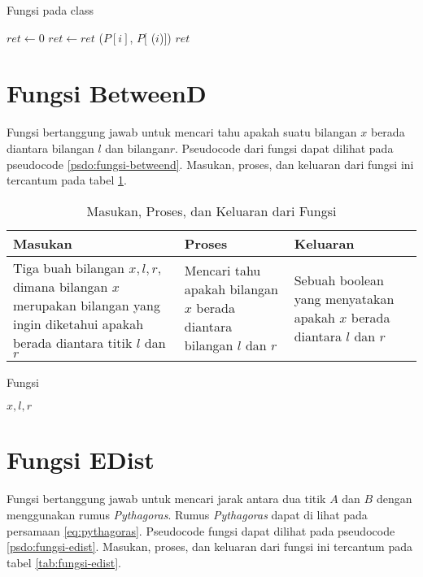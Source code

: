\begin{algorithm}
    \caption{Fungsi  pada class }
	\label{psdo:class-polygon-perimeter}
    \begin{algorithmic}[1]
        \State $ret \leftarrow 0$
            \State $ret \leftarrow ret $ ($P[i]$, $P[$ ($i$)$] $)
        \EndFor
        \State \Return $ret$
	\end{algorithmic}
\end{algorithm}

\section{ Fungsi BetweenD}
\label{sec:fungsi-betweend}
Fungsi  bertanggung jawab untuk mencari tahu apakah suatu bilangan $x$ berada diantara bilangan $l$ dan bilangan$r$. Pseudocode dari fungsi  dapat dilihat pada pseudocode \ref{psdo:fungsi-betweend}. Masukan, proses, dan keluaran dari fungsi ini tercantum pada tabel \ref{tab:fungsi-betweend}.

\begin{table}[htb]
	\Centering
	\caption{Masukan, Proses, dan Keluaran dari Fungsi  }
	\begin{tabular}{|p{3cm}|p{3cm}|p{3cm}|}
	\hline
	Masukan   & Proses     & Keluaran \\ \hline
	Tiga buah bilangan $x,l,r$, dimana bilangan $x$ merupakan bilangan yang ingin diketahui apakah berada diantara titik $l$ dan $r$ & Mencari tahu apakah bilangan $x$ berada diantara bilangan $l$ dan $r$ &   Sebuah boolean yang menyatakan apakah $x$ berada diantara $l$ dan $r$     \\ \hline
	\end{tabular}
	\label{tab:fungsi-betweend}
\end{table}
\begin{algorithm}
    \caption{Fungsi }
	\label{psdo:fungsi-betweend}
    \begin{algorithmic}[1]
        \Require $x, l, r$
            \State \Return {}
        \Else
            \State \Return {}
        \EndIf
	\end{algorithmic}
\end{algorithm}


\section{ Fungsi EDist}
\label{sec:fungsi-edist}
Fungsi  bertanggung jawab untuk mencari jarak antara dua titik  $A$ dan  $B$ dengan menggunakan rumus \textit{Pythagoras}. Rumus \textit{Pythagoras} dapat di lihat pada persamaan \ref{eq:pythagoras}. Pseudocode fungsi  dapat dilihat pada pseudocode \ref{psdo:fungsi-edist}. Masukan, proses, dan keluaran dari fungsi ini tercantum pada tabel \ref{tab:fungsi-edist}.


